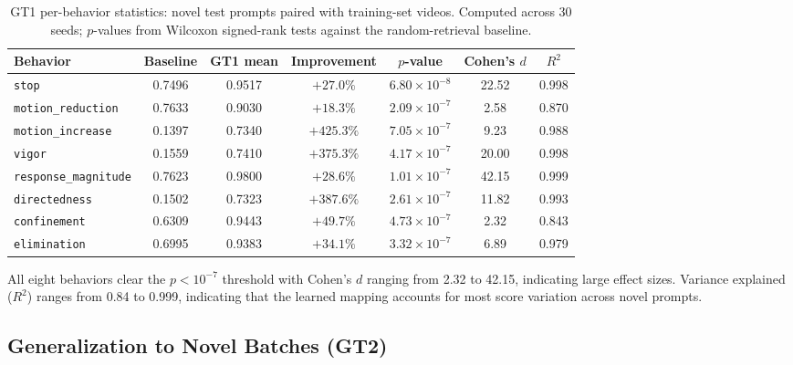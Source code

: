 \documentclass{article}
\begin{document}
\begin{table}[h]
\centering
\caption{GT1 per-behavior statistics: novel test prompts paired with training-set videos. Computed across 30 seeds; $p$-values from Wilcoxon signed-rank tests against the random-retrieval baseline.}
\label{tab:gt1_detailed}
\small
\begin{tabular}{lcccccc}
\toprule
Behavior & Baseline & GT1 mean & Improvement & $p$-value & Cohen's $d$ & $R^2$ \\
\midrule
\texttt{stop}                & 0.7496 & 0.9517 & $+27.0\%$  & $6.80 \times 10^{-8}$ & 22.52 & 0.998 \\
\texttt{motion\_reduction}   & 0.7633 & 0.9030 & $+18.3\%$  & $2.09 \times 10^{-7}$ & 2.58 & 0.870 \\
\texttt{motion\_increase}    & 0.1397 & 0.7340 & $+425.3\%$ & $7.05 \times 10^{-7}$ & 9.23 & 0.988 \\
\texttt{vigor}               & 0.1559 & 0.7410 & $+375.3\%$ & $4.17 \times 10^{-7}$ & 20.00 & 0.998 \\
\texttt{response\_magnitude} & 0.7623 & 0.9800 & $+28.6\%$  & $1.01 \times 10^{-7}$ & 42.15 & 0.999 \\
\texttt{directedness}        & 0.1502 & 0.7323 & $+387.6\%$ & $2.61 \times 10^{-7}$ & 11.82 & 0.993 \\
\texttt{confinement}         & 0.6309 & 0.9443 & $+49.7\%$  & $4.73 \times 10^{-7}$ & 2.32 & 0.843 \\
\texttt{elimination}         & 0.6995 & 0.9383 & $+34.1\%$  & $3.32 \times 10^{-7}$ & 6.89 & 0.979 \\
\bottomrule
\end{tabular}
\end{table}

All eight behaviors clear the $p < 10^{-7}$ threshold with Cohen's $d$ ranging from 2.32 to 42.15, indicating large effect sizes. Variance explained ($R^2$) ranges from 0.84 to 0.999, indicating that the learned mapping accounts for most score variation across novel prompts.

\subsection{Generalization to Novel Batches (GT2)}
\end{document}

